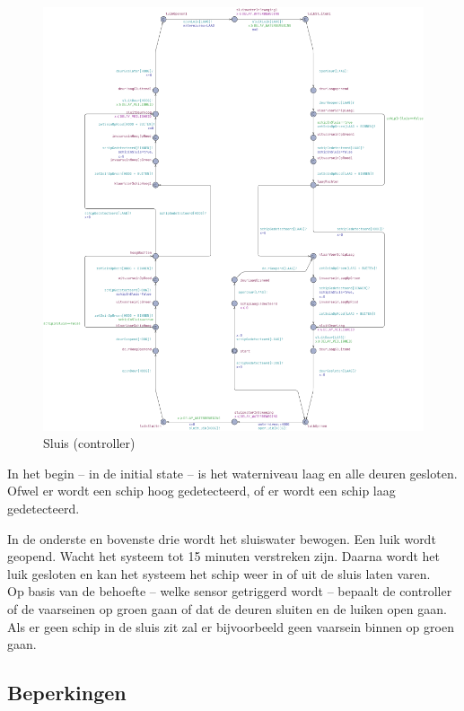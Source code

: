 \documentclass{article} %
\begin{document}
\begin{figure}[h]
    \includegraphics[width=\linewidth]{sluis.png}
    \centering    
    \caption{Sluis (controller)}
\end{figure}

In het begin -- in de initial state -- is het waterniveau laag en alle deuren gesloten. Ofwel er wordt een schip hoog gedetecteerd, of er wordt een schip laag gedetecteerd. \par

In de onderste en bovenste drie wordt het sluiswater bewogen. Een luik wordt geopend. Wacht het systeem tot 15 minuten verstreken zijn. Daarna wordt het luik gesloten en kan het systeem het schip weer in of uit de sluis laten varen. \\
Op basis van de behoefte -- welke sensor getriggerd wordt -- bepaalt de controller of de vaarseinen op groen gaan of dat de deuren sluiten en de luiken open gaan. \\
Als er geen schip in de sluis zit zal er bijvoorbeeld geen vaarsein binnen op groen gaan.

\newpage

\subsection{Beperkingen}
\end{document}
